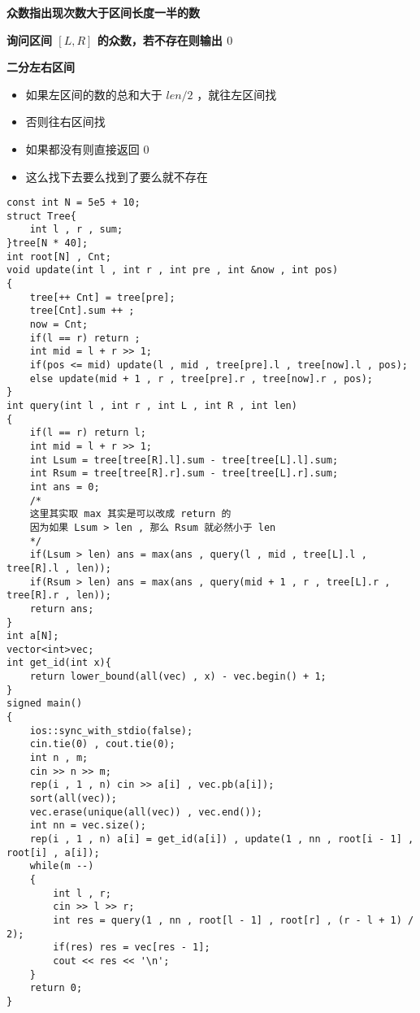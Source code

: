 \documentclass[E:/GsjzTle/main/main.tex]{subfiles}
\begin{document}
\textbf{众数指出现次数大于区间长度一半的数}

\textbf{询问区间 \([L , R]\) 的众数，若不存在则输出 \(0\)}

\textbf{二分左右区间}

\begin{itemize}
\item
  如果左区间的数的总和大于 \(len / 2\) ，就往左区间找
\item
  否则往右区间找
\item
  如果都没有则直接返回 \(0\)
\item
  这么找下去要么找到了要么就不存在
\end{itemize}

\begin{lstlisting}
const int N = 5e5 + 10;
struct Tree{
	int l , r , sum;
}tree[N * 40];
int root[N] , Cnt;
void update(int l , int r , int pre , int &now , int pos)
{
	tree[++ Cnt] = tree[pre];
	tree[Cnt].sum ++ ;
	now = Cnt;
	if(l == r) return ;
	int mid = l + r >> 1;
	if(pos <= mid) update(l , mid , tree[pre].l , tree[now].l , pos);
	else update(mid + 1 , r , tree[pre].r , tree[now].r , pos);
}
int query(int l , int r , int L , int R , int len)
{
	if(l == r) return l;
	int mid = l + r >> 1;
	int Lsum = tree[tree[R].l].sum - tree[tree[L].l].sum;
	int Rsum = tree[tree[R].r].sum - tree[tree[L].r].sum;
	int ans = 0;
	/*
	这里其实取 max 其实是可以改成 return 的
	因为如果 Lsum > len , 那么 Rsum 就必然小于 len 
	*/
	if(Lsum > len) ans = max(ans , query(l , mid , tree[L].l , tree[R].l , len));
	if(Rsum > len) ans = max(ans , query(mid + 1 , r , tree[L].r , tree[R].r , len));
	return ans;
}
int a[N];
vector<int>vec;
int get_id(int x){
	return lower_bound(all(vec) , x) - vec.begin() + 1;
}
signed main()
{
	ios::sync_with_stdio(false);
	cin.tie(0) , cout.tie(0);
	int n , m;
	cin >> n >> m;
	rep(i , 1 , n) cin >> a[i] , vec.pb(a[i]);
	sort(all(vec));
	vec.erase(unique(all(vec)) , vec.end());
	int nn = vec.size();
	rep(i , 1 , n) a[i] = get_id(a[i]) , update(1 , nn , root[i - 1] , root[i] , a[i]);
	while(m --)
	{
		int l , r;
		cin >> l >> r;
		int res = query(1 , nn , root[l - 1] , root[r] , (r - l + 1) / 2);
		if(res) res = vec[res - 1];
		cout << res << '\n';
	}
	return 0;
} 
\end{lstlisting}
\end{document}
